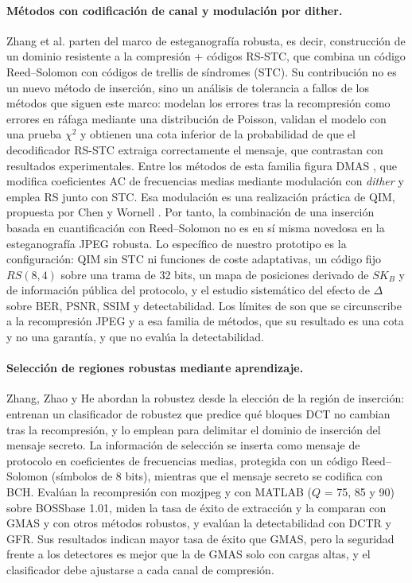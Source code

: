 \documentclass[IB]{TFUOC}%
\begin{document}
\paragraph{Métodos con codificación de canal y modulación por dither.} Zhang et al. \cite{20} parten del marco de esteganografía robusta, es decir, construcción de un dominio resistente a la compresión + códigos RS-STC, que combina un código Reed--Solomon con códigos de trellis de síndromes (STC). Su contribución no es un nuevo método de inserción, sino un análisis de tolerancia a fallos de los métodos que siguen este marco: modelan los errores tras la recompresión como errores en ráfaga mediante una distribución de Poisson, validan el modelo con una prueba $\chi^2$ y obtienen una cota inferior de la probabilidad de que el decodificador RS-STC extraiga correctamente el mensaje, que contrastan con resultados experimentales. Entre los métodos de esta familia figura DMAS \cite{zhang2018dmas}, que modifica coeficientes AC de frecuencias medias mediante modulación con \textit{dither} y emplea RS junto con STC. Esa modulación es una realización práctica de QIM, propuesta por Chen y Wornell \cite{11}. Por tanto, la combinación de una inserción basada en cuantificación con Reed--Solomon no es en sí misma novedosa en la esteganografía JPEG robusta. Lo específico de nuestro prototipo es la configuración: QIM sin STC ni funciones de coste adaptativas, un código fijo $RS(8,4)$ sobre una trama de 32 bits, un mapa de posiciones derivado de $SK_B$ y de información pública del protocolo, y el estudio sistemático del efecto de $\Delta$ sobre $\mathrm{BER}$, $\mathrm{PSNR}$, $\mathrm{SSIM}$ y detectabilidad. Los límites de \cite{20} son que se circunscribe a la recompresión JPEG y a esa familia de métodos, que su resultado es una cota y no una garantía, y que no evalúa la detectabilidad.

\paragraph{Selección de regiones robustas mediante aprendizaje.} Zhang, Zhao y He \cite{18} abordan la robustez desde la elección de la región de inserción: entrenan un clasificador de robustez que predice qué bloques DCT no cambian tras la recompresión, y lo emplean para delimitar el dominio de inserción del mensaje secreto. La información de selección se inserta como mensaje de protocolo en coeficientes de frecuencias medias, protegida con un código Reed--Solomon (símbolos de 8 bits), mientras que el mensaje secreto se codifica con BCH. Evalúan la recompresión con mozjpeg y con MATLAB ($Q$ = 75, 85 y 90) sobre BOSSbase 1.01, miden la tasa de éxito de extracción y la comparan con GMAS y con otros métodos robustos, y evalúan la detectabilidad con DCTR y GFR. Sus resultados indican mayor tasa de éxito que GMAS, pero la seguridad frente a los detectores es mejor que la de GMAS solo con cargas altas, y el clasificador debe ajustarse a cada canal de compresión.
\end{document}
